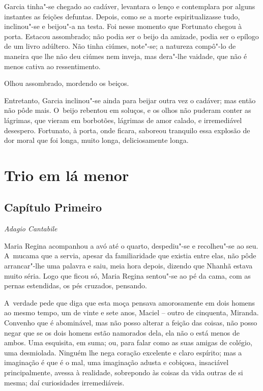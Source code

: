 Garcia tinha"-se chegado ao cadáver, levantara o lenço e contemplara por
alguns instantes as feições defuntas. Depois, como se a morte
espiritualizasse tudo, inclinou"-se e beijou"-a na testa. Foi nesse
momento que Fortunato chegou à porta. Estacou assombrado; não podia ser
o beijo da amizade, podia ser o epílogo de um livro adúltero. Não tinha
ciúmes, note"-se; a natureza compô"-lo de maneira que lhe não deu ciúmes
nem inveja, mas dera"-lhe vaidade, que não é menos cativa ao
ressentimento.

Olhou assombrado, mordendo os beiços.

Entretanto, Garcia inclinou"-se ainda para beijar outra vez o cadáver;
mas então não pôde mais. O~beijo rebentou em soluços, e os olhos não
puderam conter as lágrimas, que vieram em borbotões, lágrimas de amor
calado, e irremediável desespero. Fortunato, à porta, onde ficara,
saboreou tranquilo essa explosão de dor moral que foi longa, muito
longa, deliciosamente longa.

\chapter{Trio em lá menor}

\section{Capítulo Primeiro}

\emph{Adagio Cantabile}

Maria Regina acompanhou a avó até o quarto, despediu"-se e recolheu"-se ao
seu. A~mucama que a servia, apesar da familiaridade que existia entre
elas, não pôde arrancar"-lhe uma palavra e saiu, meia hora depois,
dizendo que Nhanhã estava muito séria. Logo que ficou só, Maria Regina
sentou"-se ao pé da cama, com as pernas estendidas, os pés cruzados,
pensando.

A~verdade pede que diga que esta moça pensava amorosamente em dois
homens ao mesmo tempo, um de vinte e sete anos, Maciel -- outro de
cinquenta, Miranda. Convenho que é abominável, mas não posso alterar a
feição das coisas, não posso negar que se os dois homens estão namorados
dela, ela não o está menos de ambos. Uma esquisita, em suma; ou, para
falar como as suas amigas de colégio, uma desmiolada. Ninguém lhe nega
coração excelente e claro espírito; mas a imaginação é que é o mal, uma
imaginação adusta e cobiçosa, insaciável principalmente, avessa à
realidade, sobrepondo às coisas da vida outras de si mesma; daí
curiosidades irremediáveis.

